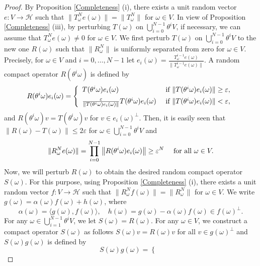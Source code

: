 \documentclass[pdflatex,sn-mathphys-num]{sn-jnl}%
\theoremstyle{thmstyleone}%
\theoremstyle{thmstyletwo}%
\theoremstyle{thmstylethree}%
\newcommand{\cH}{\mathcal{H}}
\newcommand{\eps}{\varepsilon}
\numberwithin{equation}{section}
\begin{document}
\begin{proof}
By Proposition \ref{Completeness} (i), there exists a unit random vector $e:V\rightarrow \cH$ such that $\|T_{\omega}^N e(\omega)\|= \|T_{\omega}^N\|$ for $\omega\in V$. In view of  Proposition \ref{Completeness} (iii), by perturbing $T(\omega)$ on $\bigcup_{i=0}^{N-1}\theta^i V$, if necessary, we can assume that $T^N_{\omega}e(\omega)\not=0$ for $\omega\in V$. We first perturb $T(\omega)$ on $\bigcup_{i=0}^{N-1}\theta^i V$ to the new one $R(\omega)$ such that $\|R^{N}_{\omega}\|$ is uniformly separated from zero for $\omega\in V$. Precisely, for $\omega\in V$ and $i=0,\dots,N-1$ let  $e_{i}(\omega)=\frac{T^{i-1}_{\omega} e(\omega)}{\|T^{i-1}_{\omega} e(\omega)\|} $. A random compact operator $R(\theta^i\omega)$ is defined by 
\[
R(\theta^i\omega) e_i(\omega)
=
\left\{
\begin{array}{ll}
    T(\theta^i\omega)  e_i(\omega)& \hbox{ if } \|T(\theta^i\omega)  e_i(\omega)\| \geq \eps,  \\[1ex]
     \frac{\eps}{\|T(\theta^i\omega)e_i(\omega)\|}T(\theta^i\omega) e_i(\omega)     & \hbox{ if } \|T(\theta^i\omega)  e_i(\omega)\| < \eps,
\end{array}
\right.
\]
and 
$R(\theta^i\omega)v= T(\theta^i\omega) v$ for $v\in e_i(\omega)^{\perp}$. Then, it is easily seen that $\|R(\omega)-T(\omega)\|\leq 2\eps$ for $\omega\in \bigcup_{i=0}^{N-1}\theta^i V$ and 
\begin{equation}\label{NormSeparatedzero}
\|R^N_{\omega}e(\omega)\|=\prod_{i=0}^{N-1}\left\| R(\theta^i\omega)e_i(\omega)\right\|\geq \eps^N\quad\hbox{ for all } \omega\in V.     
\end{equation}
Now, we will perturb $R(\omega)$ to obtain the desired random compact operator $S(\omega)$. For this purpose, using Proposition \ref{Completeness} (i), there exists a unit random vector $f:V\rightarrow \cH$ such that $\|R_{\omega}^N f(\omega)\|= \|R_{\omega}^N\|$ for $\omega\in V$.
We write $g(\omega)=\alpha(\omega) f(\omega)+ h(\omega)$, where 
\[
\alpha(\omega)=\langle g(\omega), f(\omega)\rangle,\quad
h(\omega)=g(\omega)-\alpha(\omega) f(\omega)\in f(\omega)^{\perp}.
\]
For any $\omega\in\bigcup_{i=1}^{N-1}\theta^i V$, we let $S(\omega)=R(\omega)$. For any $\omega\in V$, we construct a compact operator $S(\omega)$ as follows $S(\omega)v=R(\omega)v$ for all $v\in g(\omega)^{\perp}$ and $S(\omega)g(\omega)$ is defined by 
\begin{equation}\label{ConstructionS}
S(\omega) g(\omega)
=
\left\{
\begin{array}{ll}

\end{array}
\end{equation}
\end{proof}
\end{document}
